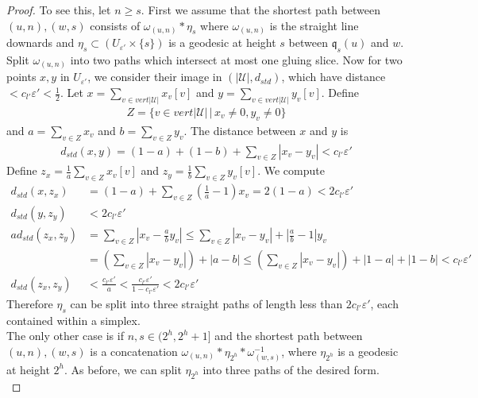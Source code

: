 \documentclass[a4paper,11pt]{article}
\theoremstyle{definition}
\theoremstyle{plain}
\theoremstyle{remark}
\begin{document}
{\begin{proof}
To see this, let $n\geq s$. First we assume that the shortest path between $(u,n),(w,s)$ consists of $\omega_{(u,n)}\ast \eta_{s}$ where $\omega_{(u,n)}$ is the straight line downards and $\eta_{s} \subset (U_{\varepsilon'} \times \{s\})$ is a geodesic at height $s$ between $\mathfrak{q}_{s}(u)$ and $w$. Split $\omega_{(u,n)}$ into two paths which intersect at most one gluing slice. Now for two points $x,y$ in $U_{\varepsilon'}$, we consider their image in $(|\mathcal{U}|, d_{std})$, which have distance $< c_{l'}\varepsilon'<\frac{1}{2}$. Let $x = \sum_{v \in vert |\mathcal{U}|} x_{v} [v]$ and $y =  \sum_{v \in vert |\mathcal{U}|} y_{v} [v]$. Define
\begin{align*}
Z = \{v\in vert|\mathcal{U}|\,|\, x_{v}\neq 0, y_{v} \neq 0\}
\end{align*}
 and $a = \sum_{v \in Z} x_{v}$ and $b = \sum_{v \in Z} y_{v}$. The distance between $x$ and $y$ is 
\begin{align*}
d_{std}(x,y) = (1-a) + (1-b) + \sum_{v \in Z} |x_{v}-y_{v}| < c_{l'}\varepsilon'
\end{align*} 
Define $z_{x} = \frac{1}{a}\sum_{v\in Z} x_{v} [v]$ and $z_{y} = \frac{1}{b} \sum_{v\in Z} y_{v} [v]$. We compute
\begin{align*}
d_{std}(x,z_{x}) &= (1-a) + \sum_{v\in Z} (\frac{1}{a}-1) x_{v} = 2(1-a) < 2c_{l'}\varepsilon'\\
d_{std}(y,z_{y}) &< 2c_{l'}\varepsilon'\\
a d_{std}(z_{x},z_{y}) &= \sum_{v \in Z} |x_{v}-\frac{a}{b} y_{v}|\leq \sum_{v \in Z} |x_{v}- y_{v}|+ |\frac{a}{b}-1| y_{v}\\
&= (\sum_{v \in Z} |x_{v}- y_{v}|)+ |a-b| \leq (\sum_{v \in Z} |x_{v}- y_{v}|)+ |1-a| + |1-b| < c_{l'}\varepsilon'\\
d_{std}(z_{x},z_{y}) &<\frac{c_{l'}\varepsilon'}{a} <\frac{c_{l'}\varepsilon'}{1-c_{l'}\varepsilon'} <2c_{l'}\varepsilon'
\end{align*}
Therefore $\eta_{s}$ can be split into three straight paths of length less than $2c_{l'}\varepsilon'$, each contained within a simplex. \\

The only other case is if $n,s\in (2^{h},2^{h}+1]$ and the shortest path between $(u,n),(w,s)$ is a concatenation $\omega_{(u,n)} \ast \eta_{2^h} \ast \omega_{(w,s)}^{-1}$, where $\eta_{2^h}$ is a geodesic at height $2^h$. As before, we can split $\eta_{2^h}$ into three paths of the desired form.\\


\end{proof}}
\end{document}
